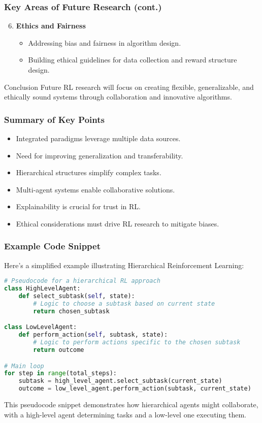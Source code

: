 \documentclass{beamer}
\begin{document}
\begin{frame}[fragile]
    \frametitle{Key Areas of Future Research (cont.)}
    \begin{enumerate}
        \setcounter{enumi}{5}
        \item \textbf{Ethics and Fairness}
            \begin{itemize}
                \item Addressing bias and fairness in algorithm design.
                \item Building ethical guidelines for data collection and reward structure design.
            \end{itemize}
    \end{enumerate}
    \begin{block}{Conclusion}
        Future RL research will focus on creating flexible, generalizable, and ethically sound systems through collaboration and innovative algorithms.
    \end{block}
\end{frame}

\begin{frame}[fragile]
    \frametitle{Summary of Key Points}
    \begin{itemize}
        \item Integrated paradigms leverage multiple data sources.
        \item Need for improving generalization and transferability.
        \item Hierarchical structures simplify complex tasks.
        \item Multi-agent systems enable collaborative solutions.
        \item Explainability is crucial for trust in RL.
        \item Ethical considerations must drive RL research to mitigate biases.
    \end{itemize}
\end{frame}

\begin{frame}[fragile]
    \frametitle{Example Code Snippet}
    Here’s a simplified example illustrating Hierarchical Reinforcement Learning:
    \begin{lstlisting}[language=Python]
# Pseudocode for a hierarchical RL approach
class HighLevelAgent:
    def select_subtask(self, state):
        # Logic to choose a subtask based on current state
        return chosen_subtask

class LowLevelAgent:
    def perform_action(self, subtask, state):
        # Logic to perform actions specific to the chosen subtask
        return outcome

# Main loop
for step in range(total_steps):
    subtask = high_level_agent.select_subtask(current_state)
    outcome = low_level_agent.perform_action(subtask, current_state)
    \end{lstlisting}
    This pseudocode snippet demonstrates how hierarchical agents might collaborate, with a high-level agent determining tasks and a low-level one executing them.
\end{frame}
\end{document}
